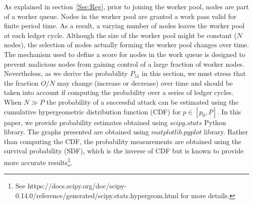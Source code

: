 As explained in section~\ref{Sec:Reg}, prior to joining the worker pool, nodes are part of a worker queue. Nodes in the worker pool are granted a work pass valid for finite period time. As a result, a varying number of nodes leaves the worker pool at each ledger cycle. Although the size of the worker pool might be constant ($N$ nodes), the selection of nodes actually forming the worker pool changes over time. The mechanism used to define a score for nodes in the work queue is designed to prevent malicious nodes from gaining control of a large fraction of worker nodes. Nevertheless, as we derive the probability $P_{51}$ in this section, we must stress that the fraction $O/N$ may change (increase or decrease) over time and should be taken into account if computing the probability over a series of ledger cycles.\\

When $N \gg P$ the probability of a successful attack can be estimated using the cumulative hypergeometric distribution function (CDF) for $p \in [p_0,P]$. In this paper, we provide probability estimates obtained using $scipy.stats$ Python library. The graphs presented are obtained using $matplotlib.pyplot$ library. Rather than computing the CDF, the probability measurements are obtained using the survival probability (SDF), which is the inverse of CDF but is known to provide more accurate results\footnote{See https://docs.scipy.org/doc/scipy-0.14.0/reference/generated/scipy.stats.hypergeom.html for more details.}. \\

